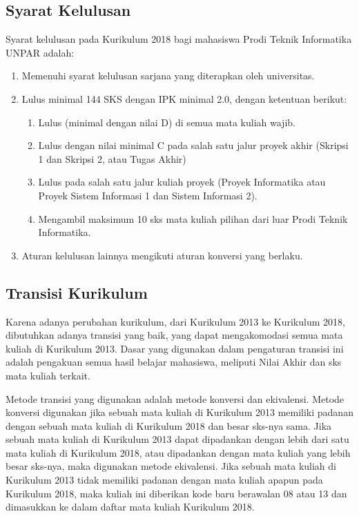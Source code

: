 \subsection{Syarat Kelulusan}

Syarat kelulusan pada Kurikulum 2018 bagi mahasiswa Prodi Teknik Informatika UNPAR adalah:
\begin{enumerate}
	\item Memenuhi syarat kelulusan sarjana yang diterapkan oleh universitas.
	\item Lulus minimal 144 SKS dengan IPK minimal 2.0, dengan ketentuan berikut:
	\begin{enumerate}
		\item Lulus (minimal dengan nilai D) di semua mata kuliah wajib.
		\item Lulus dengan nilai minimal C pada salah satu jalur proyek akhir (Skripsi 1 dan Skripsi 2, atau Tugas
Akhir)
		\item Lulus pada salah satu jalur kuliah proyek (Proyek Informatika atau Proyek Sistem Informasi 1 dan Sistem Informasi 2).
		\item Mengambil maksimum 10 sks mata kuliah pilihan dari luar Prodi Teknik Informatika.
	\end{enumerate}
	\item Aturan kelulusan lainnya mengikuti aturan konversi yang berlaku.
\end{enumerate}

\subsection{Transisi Kurikulum}

Karena adanya perubahan kurikulum, dari Kurikulum 2013 ke Kurikulum 2018, dibutuhkan adanya transisi yang baik, yang dapat mengakomodasi semua mata kuliah di Kurikulum 2013. Dasar yang digunakan dalam pengaturan transisi ini adalah pengakuan semua hasil belajar mahasiswa, meliputi Nilai Akhir dan sks mata kuliah terkait. 

Metode transisi yang digunakan adalah metode konversi dan ekivalensi. Metode konversi digunakan jika
sebuah mata kuliah di Kurikulum 2013 memiliki padanan dengan sebuah mata kuliah di Kurikulum 2018
dan besar sks-nya sama. Jika sebuah mata kuliah di Kurikulum 2013 dapat dipadankan dengan lebih dari
satu mata kuliah di Kurikulum 2018, atau dipadankan dengan mata kuliah yang lebih besar sks-nya, maka
digunakan metode ekivalensi. Jika sebuah mata kuliah di Kurikulum 2013 tidak memiliki padanan dengan
mata kuliah apapun pada Kurikulum 2018, maka kuliah ini diberikan kode baru berawalan 08 atau 13 dan
dimasukkan ke dalam daftar mata kuliah Kurikulum 2018.

